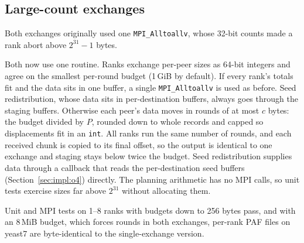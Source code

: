 \subsection{Large-count exchanges}\label{sec:impl:o2}

Both exchanges originally used one \texttt{MPI\_Alltoallv}, whose 32-bit
counts made a rank abort above $2^{31}-1$ bytes.

Both now use one routine. Ranks exchange per-peer sizes as 64-bit integers
and agree on the smallest per-round budget (1\,GiB by default). If every
rank's totals fit and the data sits in one buffer, a single
\texttt{MPI\_Alltoallv} is used as before. Seed redistribution, whose data
sits in per-destination buffers, always goes through the staging buffers.
Otherwise each peer's data moves in rounds of at most $c$ bytes: the budget
divided by $P$, rounded down to whole records and capped so displacements
fit in an \texttt{int}. All ranks run the same number of rounds, and each
received chunk is copied to its final offset, so the output is identical to
one exchange and staging stays below twice the budget. Seed redistribution
supplies data through a callback that reads the per-destination seed
buffers (Section~\ref{sec:impl:o4}) directly. The planning arithmetic has
no MPI calls, so unit tests exercise sizes far above $2^{31}$ without
allocating them.

Unit and MPI tests on 1--8 ranks with budgets down to 256 bytes pass, and
with an 8\,MiB budget, which forces rounds in both exchanges, per-rank PAF
files on yeast7 are byte-identical to the single-exchange version.
